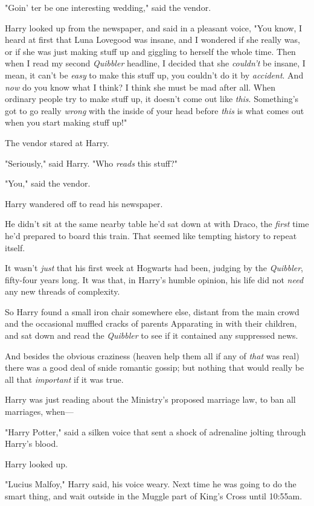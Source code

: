 "Goin' ter be one interesting wedding," said the vendor.

Harry looked up from the newspaper, and said in a pleasant voice, "You know, I 
heard at first that Luna Lovegood was insane, and I wondered if she really was, 
or if she was just making stuff up and giggling to herself the whole time. Then 
when I read my second \emph{Quibbler} headline, I decided that she 
\emph{couldn't} be insane, I mean, it can't be \emph{easy} to make this stuff 
up, you couldn't do it by \emph{accident}. And \emph{now} do you know what I 
think? I think she must be mad after all. When ordinary people try to make 
stuff up, it doesn't come out like \emph{this}. Something's got to go really 
\emph{wrong} with the inside of your head before \emph{this} is what comes out 
when you start making stuff up!"

The vendor stared at Harry.

"Seriously," said Harry. "Who \emph{reads} this stuff?"

"You," said the vendor.

Harry wandered off to read his newspaper.

He didn't sit at the same nearby table he'd sat down at with Draco, the 
\emph{first} time he'd prepared to board this train. That seemed like tempting 
history to repeat itself.

It wasn't \emph{just} that his first week at Hogwarts had been, judging by the 
\emph{Quibbler}, fifty-four years long. It was that, in Harry's humble opinion, 
his life did not \emph{need} any new threads of complexity.

So Harry found a small iron chair somewhere else, distant from the main crowd 
and the occasional muffled cracks of parents Apparating in with their children, 
and sat down and read the \emph{Quibbler} to see if it contained any suppressed 
news.

And besides the obvious craziness (heaven help them all if any of \emph{that} 
was real) there was a good deal of snide romantic gossip; but nothing that 
would really be all that \emph{important} if it was true.

Harry was just reading about the Ministry's proposed marriage law, to ban all 
marriages, when---

"Harry Potter," said a silken voice that sent a shock of adrenaline jolting 
through Harry's blood.

Harry looked up.

"Lucius Malfoy," Harry said, his voice weary. Next time he was going to do the 
smart thing, and wait outside in the Muggle part of King's Cross until 10:55am.

